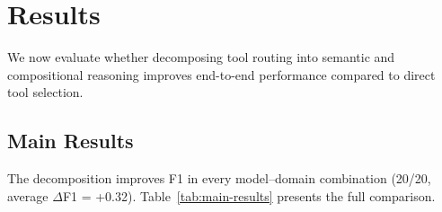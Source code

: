 
\section{Results}
\label{sec:results}

We now evaluate whether decomposing tool routing into semantic and compositional reasoning improves end-to-end performance compared to direct tool selection.

\subsection{Main Results}
\label{sec:main-results}

The decomposition improves F1 in every model--domain combination (20/20, average $\Delta$F1 = +0.32).
Table~\ref{tab:main-results} presents the full comparison.

